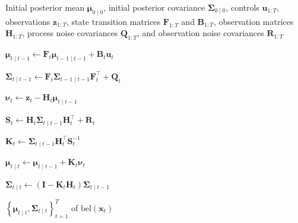 \documentclass[../Bayesian_Inference.tex]{subfiles}
\begin{document}
\begin{algorithm}[H]
\caption{Kalman Filter}
\label{alg:kalman-filter}
\begin{algorithmic}[1]

\Require Initial posterior mean $\bm{\mu}_{0\mid 0}$, initial posterior covariance $\mathbf{\Sigma}_{0\mid 0}$, controls $\bm{u}_{1:T}$, observations $\bm{z}_{1:T}$, state transition matrices $\mathbf{F}_{1:T}$ and $\mathbf{B}_{1:T}$, observation matrices $\mathbf{H}_{1:T}$, process noise covariances $\mathbf{Q}_{1:T}$, and observation noise covariances $\mathbf{R}_{1:T}$


    \State $\bm{\mu}_{t\mid t-1}\gets \mathbf{F}_t\bm{\mu}_{t-1\mid t-1} + \mathbf{B}_t\bm{u}_t$

    \State $\mathbf{\Sigma}_{t\mid t-1}\gets \mathbf{F}_t\mathbf{\Sigma}_{t-1\mid t-1}\mathbf{F}_t^\top + \mathbf{Q}_t$

    \State $\bm{\nu}_t\gets \bm{z}_t-\mathbf{H}_t\bm{\mu}_{t\mid t-1}$

    \State $\mathbf{S}_t\gets \mathbf{H}_t\mathbf{\Sigma}_{t\mid t-1}\mathbf{H}_t^\top + \mathbf{R}_t$

    \State $\mathbf{K}_t\gets \mathbf{\Sigma}_{t\mid t-1}\mathbf{H}_t^\top\mathbf{S}_t^{-1}$

    \State $\bm{\mu}_{t\mid t} \gets \bm{\mu}_{t\mid t-1} + \mathbf{K}_t\bm{\nu}_t$

    \State $\mathbf{\Sigma}_{t\mid t}\gets \left(\mathbf{I}-\mathbf{K}_t\mathbf{H}_t\right) \mathbf{\Sigma}_{t\mid t-1}$

\EndFor

\State \Return
$\left\{ \bm{\mu}_{t\mid t}, \mathbf{\Sigma}_{t\mid t} \right\}_{t=1}^{T}$ of $\mathrm{bel}(\bm{x}_t)$

\end{algorithmic}
\end{algorithm}
\end{document}
